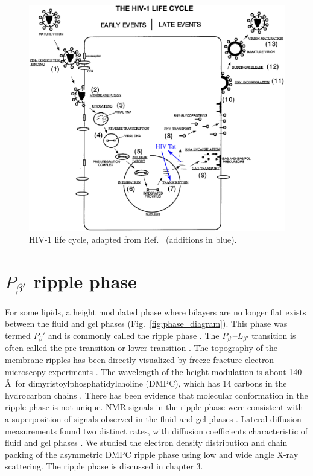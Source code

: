 \begin{figure}
  \centering
  \includegraphics[width=\textwidth]{figures/HIV_lifecycle}
  \caption{HIV-1 life cycle, adapted from Ref.~\cite{Freed98}
  (additions in blue).}
  \label{fig:HIV_lifecycle}
\end{figure}

\section{$P_{\beta'}$ ripple phase}
For some lipids, a height modulated phase where
bilayers are no longer flat exists between the fluid and gel phases
(Fig.~\ref{fig:phase_diagram}). 
This phase was termed $P_\beta'$ 
and is commonly called the ripple phase \cite{ref:Tardieu73}. 
The $P_{\beta'}$--$L_{\beta'}$ transition is often
called the pre-transition \cite{ref:Wack89} or lower transition \cite{Nagle00}.
The topography of the membrane ripples has been directly
visualized by freeze fracture electron microscopy experiments 
\cite{ref:Luna77,ref:Copeland80,ref:Ruppel83,ref:Zasadzinski87,ref:Zasadzinski88}.
The wavelength of the height modulation is about 140 \AA\ for 
dimyristoylphosphatidylcholine (DMPC),
which has 14 carbons in the hydrocarbon chains \cite{ref:Wack89}.
There has been evidence that molecular conformation in the ripple phase is not 
unique. NMR signals in the ripple phase were consistent
with a superposition of signals observed in the fluid and gel phases
\cite{ref:Wittebort81}.
Lateral diffusion measurements found two distinct rates,
with diffusion coefficients characteristic of fluid and gel phases
\cite{ref:Schneider83}. 
We studied the electron density distribution and chain packing 
of the asymmetric DMPC ripple phase using low and wide angle X-ray scattering.
The ripple phase is discussed in chapter 3. 

